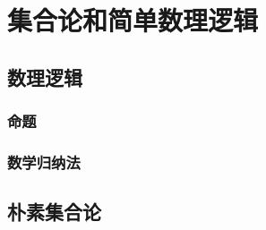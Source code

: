 


    \chapter{集合论和简单数理逻辑} 
    
    \section{数理逻辑}

    \subsection{命题}
    
    

    \subsection{数学归纳法}
    
    
    \section{朴素集合论}
    

